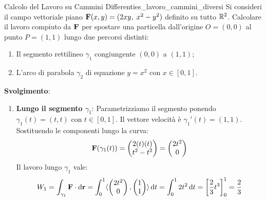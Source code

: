 \begin{esempio}{Calcolo del Lavoro su Cammini Differenti}{es_lavoro_cammini_diversi}
Si consideri il campo vettoriale piano $\mathbf{F}(x,y) = (2xy, \; x^2 - y^2)$ definito su tutto $\mathbb{R}^2$. Calcolare il lavoro compiuto da $\mathbf{F}$ per spostare una particella dall'origine $O = (0,0)$ al punto $P = (1,1)$ lungo due percorsi distinti:
\begin{enumerate}
    \item Il segmento rettilineo $\gamma_1$ congiungente $(0,0)$ a $(1,1)$;
    \item L'arco di parabola $\gamma_2$ di equazione $y = x^2$ con $x \in [0,1]$.
\end{enumerate}

\textbf{Svolgimento}:
\begin{enumerate}
    \item \textbf{Lungo il segmento $\gamma_1$}:
    Parametrizziamo il segmento ponendo $\gamma_1(t) = (t, t)$ con $t \in [0, 1]$.
    Il vettore velocità è $\gamma_1'(t) = (1, 1)$.
    Sostituendo le componenti lungo la curva:
    \[
    \mathbf{F}(\gamma_1(t)) = \begin{pmatrix} 2(t)(t) \\ t^2 - t^2 \end{pmatrix} = \begin{pmatrix} 2t^2 \\ 0 \end{pmatrix}
    \]
    Il lavoro lungo $\gamma_1$ vale:
    \[
    W_1 = \int_{\gamma_1} \mathbf{F} \cdot \mathop{}\!\mathrm{d}\mathbf{r} = \int_{0}^{1} \langle\begin{pmatrix} 2t^2 \\ 0 \end{pmatrix}, \begin{pmatrix} 1 \\ 1 \end{pmatrix}\rangle \mathop{}\!\mathrm{d} t = \int_{0}^{1} 2t^2 \mathop{}\!\mathrm{d} t = \left[ \frac{2}{3} t^3 \right]_{0}^{1} = \frac{2}{3}
    \]


\end{enumerate}
\end{esempio}
